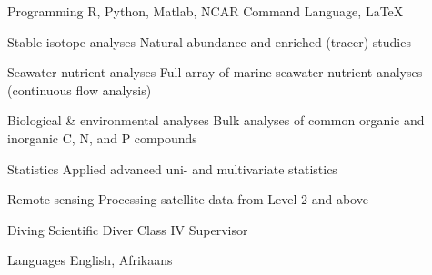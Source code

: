 


\begin{cvskills}


\cvskill
{Programming} %
{R, Python, Matlab, NCAR Command Language, LaTeX} %


\cvskill
{Stable isotope analyses}
{Natural abundance and enriched (tracer) studies}


\cvskill
{Seawater nutrient analyses}
{Full array of marine seawater nutrient analyses (continuous flow analysis)}


\cvskill
{Biological \& environmental analyses}
{Bulk analyses of common organic and inorganic C, N, and P compounds}


\cvskill
{Statistics} %
{Applied advanced uni- and multivariate statistics} %


\cvskill
{Remote sensing} %
{Processing satellite data from Level 2 and above} %

\cvskill
{Diving} %
{Scientific Diver Class IV Supervisor} %

\cvskill
{Languages} %
{English, Afrikaans} %


\end{cvskills}